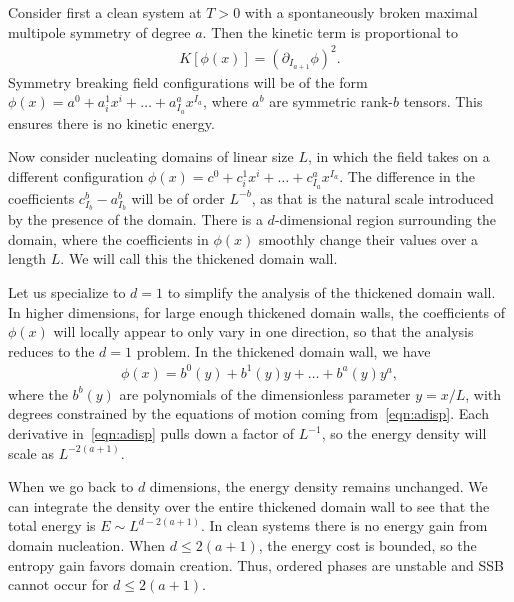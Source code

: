 \documentclass[prb,aps,twocolumn, amsfonts,amsmath,amssymb,nofootinbib,superscriptaddress]{revtex4-2}
\begin{document}
Consider first a clean system at $T>0$ with a spontaneously broken maximal multipole symmetry of degree $a$.
Then the kinetic term is proportional to 
\begin{align}
K[\phi(x)] = (\partial_{I_{a+1}} \phi)^2. \label{eqn:adisp}
\end{align} 
Symmetry breaking field configurations will be of the form $\phi(x) = a^0 + a^1_ix^i + \dots+ a^a_{I_a}x^{I_a}$, where $a^b$ are symmetric rank-$b$ tensors. This ensures there is no kinetic energy.  

Now consider nucleating domains of linear size $L$, in which the field takes on a different configuration $\phi(x) = c^0 + c^1_ix^i + \dots + c^a_{I_a}x^{I_a}$. The difference in the coefficients $c^b_{I_b}-a^b_{I_b}$ will be of order $L^{-b}$, as that is the natural scale introduced by the presence of the domain.
There is a $d$-dimensional region surrounding the domain, where the coefficients in $\phi(x)$ smoothly change their values over a length $L$. We will call this the thickened domain wall. 

Let us specialize to $d=1$ to simplify the analysis of the thickened domain wall. In higher dimensions, for large enough thickened domain walls, the coefficients of $\phi(x)$ will locally appear to only vary in one direction, so that the analysis reduces to the $d=1$ problem. In the thickened domain wall, we have 
\begin{align}
\phi(x) = b^0(y) + b^1(y) y + \dots + b^a(y) y^a,
\end{align}
where the $b^b(y)$ are polynomials of the dimensionless parameter $y=x/L$, with degrees constrained by the equations of motion coming from~\eqref{eqn:adisp}. Each derivative in~\eqref{eqn:adisp} pulls down a factor of $L^{-1}$, so the energy density will scale as $L^{-2(a+1)}$.

When we go back to $d$ dimensions, the energy density remains unchanged. We can integrate the density over the entire thickened domain wall to see that the total energy is $E\sim L^{d-2(a+1)}$.
In clean systems there is no energy gain from domain nucleation. When $d\le2(a+1)$, the energy cost is bounded, so the entropy gain favors domain creation. Thus, ordered phases are unstable and SSB cannot occur for $d\le2(a+1)$.
\end{document}
